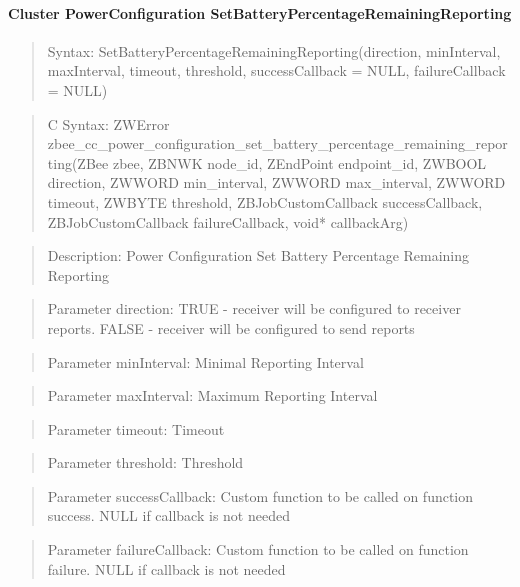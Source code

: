 \paragraph{Cluster PowerConfiguration SetBatteryPercentageRemainingReporting}
\begin{quote}Syntax: SetBatteryPercentageRemainingReporting(direction, minInterval, maxInterval, timeout, threshold, successCallback = NULL, failureCallback = NULL)\end{quote}
\begin{quote}C Syntax: ZWError zbee\_cc\_power\_configuration\_set\_battery\_percentage\_remaining\_reporting(ZBee zbee, ZBNWK node\_id, ZEndPoint endpoint\_id, ZWBOOL direction, ZWWORD min\_interval, ZWWORD max\_interval, ZWWORD timeout, ZWBYTE threshold, ZBJobCustomCallback successCallback, ZBJobCustomCallback failureCallback, void* callbackArg)\end{quote}
\begin{quote}Description: Power Configuration Set Battery Percentage Remaining Reporting\end{quote}
\begin{quote}Parameter direction: TRUE  - receiver will be configured to receiver reports. FALSE - receiver will be configured to send reports\end{quote}
\begin{quote}Parameter minInterval: Minimal Reporting Interval\end{quote}
\begin{quote}Parameter maxInterval: Maximum Reporting Interval\end{quote}
\begin{quote}Parameter timeout: Timeout\end{quote}
\begin{quote}Parameter threshold: Threshold\end{quote}
\begin{quote}Parameter successCallback: Custom function to be called on function success. NULL if callback is not needed\end{quote}
\begin{quote}Parameter failureCallback: Custom function to be called on function failure. NULL if callback is not needed\end{quote}


